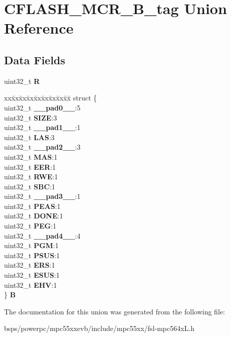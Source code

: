 \hypertarget{unionCFLASH__MCR__32B__tag}{}\section{C\+F\+L\+A\+S\+H\+\_\+\+M\+C\+R\+\_\+B\+\_\+tag Union Reference}
\label{unionCFLASH__MCR__32B__tag}
\subsection*{Data Fields}
\begin{DoxyCompactItemize}
\item 
\mbox{\label{unionCFLASH__MCR__32B__tag_a7476f3c1047f77232b3c84d4ac263e35}} 
uint32\+\_\+t {\bfseries R}
\item 
\mbox{\label{unionCFLASH__MCR__32B__tag_acfbe194d7c0373dbe1443fd0fc18e330}} 
\begin{tabbing}
xx\=xx\=xx\=xx\=xx\=xx\=xx\=xx\=xx\=\kill
struct \{\\
\>uint32\_t {\bfseries \_\_pad0\_\_}:5\\
\>uint32\_t {\bfseries SIZE}:3\\
\>uint32\_t {\bfseries \_\_pad1\_\_}:1\\
\>uint32\_t {\bfseries LAS}:3\\
\>uint32\_t {\bfseries \_\_pad2\_\_}:3\\
\>uint32\_t {\bfseries MAS}:1\\
\>uint32\_t {\bfseries EER}:1\\
\>uint32\_t {\bfseries RWE}:1\\
\>uint32\_t {\bfseries SBC}:1\\
\>uint32\_t {\bfseries \_\_pad3\_\_}:1\\
\>uint32\_t {\bfseries PEAS}:1\\
\>uint32\_t {\bfseries DONE}:1\\
\>uint32\_t {\bfseries PEG}:1\\
\>uint32\_t {\bfseries \_\_pad4\_\_}:4\\
\>uint32\_t {\bfseries PGM}:1\\
\>uint32\_t {\bfseries PSUS}:1\\
\>uint32\_t {\bfseries ERS}:1\\
\>uint32\_t {\bfseries ESUS}:1\\
\>uint32\_t {\bfseries EHV}:1\\
\} {\bfseries B}\\

\end{tabbing}\end{DoxyCompactItemize}


The documentation for this union was generated from the following file\+:\begin{DoxyCompactItemize}
\item 
bsps/powerpc/mpc55xxevb/include/mpc55xx/fsl-\/mpc564x\+L.\+h\end{DoxyCompactItemize}
